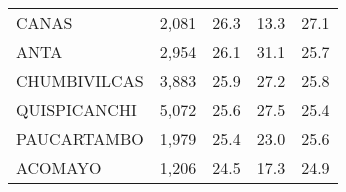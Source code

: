 \begin{tabular}{lrrrr}
	\cellcolor[HTML]{FD6864}CANAS                                           & 2,081                                                                 & 26.3                                                                             & 13.3                                                                        & 27.1                                                                                \\
	\cellcolor[HTML]{FD6864}ANTA                                            & 2,954                                                                 & 26.1                                                                             & 31.1                                                                        & 25.7                                                                                \\
	\cellcolor[HTML]{FD6864}CHUMBIVILCAS                                    & 3,883                                                                 & 25.9                                                                             & 27.2                                                                        & 25.8                                                                                \\
	\cellcolor[HTML]{FD6864}QUISPICANCHI                                    & 5,072                                                                 & 25.6                                                                             & 27.5                                                                        & 25.4                                                                                \\
	\cellcolor[HTML]{FD6864}PAUCARTAMBO                                     & 1,979                                                                 & 25.4                                                                             & 23.0                                                                        & 25.6                                                                                \\
	\cellcolor[HTML]{FD6864}ACOMAYO                                         & 1,206                                                                 & 24.5                                                                             & 17.3                                                                        & 24.9                                                                                \\

\end{tabular}
